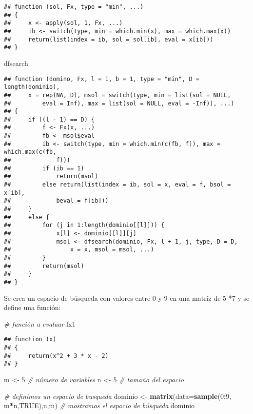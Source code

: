 \documentclass[11pt,]{article}
\newenvironment{Shaded}{\begin{snugshade}}{\end{snugshade}}
\newcommand{\CommentTok}[1]{\textcolor[rgb]{0.56,0.35,0.01}{\textit{#1}}}
\newcommand{\DataTypeTok}[1]{\textcolor[rgb]{0.13,0.29,0.53}{#1}}
\newcommand{\DecValTok}[1]{\textcolor[rgb]{0.00,0.00,0.81}{#1}}
\newcommand{\KeywordTok}[1]{\textcolor[rgb]{0.13,0.29,0.53}{\textbf{#1}}}
\newcommand{\NormalTok}[1]{#1}
\newcommand{\OperatorTok}[1]{\textcolor[rgb]{0.81,0.36,0.00}{\textbf{#1}}}
\newcommand{\OtherTok}[1]{\textcolor[rgb]{0.56,0.35,0.01}{#1}}
\newcommand{\StringTok}[1]{\textcolor[rgb]{0.31,0.60,0.02}{#1}}
\begin{document}
\begin{verbatim}
## function (sol, Fx, type = "min", ...) 
## {
##     x <- apply(sol, 1, Fx, ...)
##     ib <- switch(type, min = which.min(x), max = which.max(x))
##     return(list(index = ib, sol = sol[ib], eval = x[ib]))
## }
\end{verbatim}

\begin{Shaded}
\begin{Highlighting}[]
\NormalTok{dfsearch }
\end{Highlighting}
\end{Shaded}

\begin{verbatim}
## function (domino, Fx, l = 1, b = 1, type = "min", D = length(dominio), 
##     x = rep(NA, D), msol = switch(type, min = list(sol = NULL, 
##         eval = Inf), max = list(sol = NULL, eval = -Inf)), ...) 
## {
##     if ((l - 1) == D) {
##         f <- Fx(x, ...)
##         fb <- msol$eval
##         ib <- switch(type, min = which.min(c(fb, f)), max = which.max(c(fb, 
##             f)))
##         if (ib == 1) 
##             return(msol)
##         else return(list(index = ib, sol = x, eval = f, bsol = x[ib], 
##             beval = f[ib]))
##     }
##     else {
##         for (j in 1:length(dominio[[l]])) {
##             x[l] <- dominio[[l]][j]
##             msol <- dfsearch(dominio, Fx, l + 1, j, type, D = D, 
##                 x = x, msol = msol, ...)
##         }
##         return(msol)
##     }
## }
\end{verbatim}

Se crea un espacio de búsqueda con valores entre 0 y 9 en una matriz de
5 *7 y se define una función:

\begin{Shaded}
\begin{Highlighting}[]
\CommentTok{# función a evaluar}
\NormalTok{fx1}
\end{Highlighting}
\end{Shaded}

\begin{verbatim}
## function (x) 
## {
##     return(x^2 + 3 * x - 2)
## }
\end{verbatim}

\begin{Shaded}
\begin{Highlighting}[]
\NormalTok{m <-}\StringTok{ }\DecValTok{5}  \CommentTok{# número de variables}
\NormalTok{n <-}\StringTok{ }\DecValTok{5}  \CommentTok{# tamaño del espacio}

\CommentTok{# definimos un espacio de busqueda}
\NormalTok{dominio <-}\StringTok{ }\KeywordTok{matrix}\NormalTok{(}\DataTypeTok{data=}\KeywordTok{sample}\NormalTok{(}\DecValTok{0}\OperatorTok{:}\DecValTok{9}\NormalTok{, m}\OperatorTok{*}\NormalTok{n,}\OtherTok{TRUE}\NormalTok{),n,m)}
\CommentTok{# mostramos el espacio de búsqueda}
\NormalTok{dominio}
\end{Highlighting}
\end{Shaded}
\end{document}
